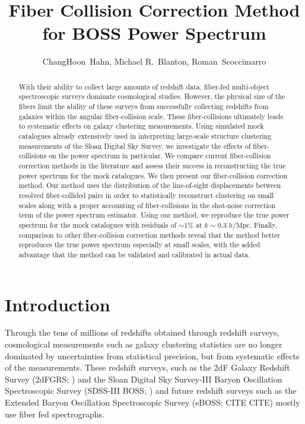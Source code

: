 \documentclass{emulateapj}
\begin{document}
\title{Fiber Collision Correction Method for BOSS Power Spectrum} 

\author{ChangHoon~Hahn, 
Michael R.~Blanton, 
Roman~Scoccimarro} 

\begin{abstract}
With their ability to collect large amounts of redshift data, fiber-fed multi-object spectroscopic surveys dominate cosmological studies. However, the physical size of the fibers limit the ability of these surveys from successfully collecting redshifts from galaxies within the angular fiber-collision scale. These fiber-collisions ultimately leads to systematic effects on galaxy clustering measurements. Using simulated mock catalogues already extensively used in interpreting large-scale structure clustering measurements of the Sloan Digital Sky Survey, we investigate the effects of fiber-collisions on the power spectrum in particular. We compare current fiber-collision correction methods in the literature and assess their success in reconstructing the true power spectrum for the mock catalogues. We then present our fiber-collision correction method. Our method uses the distribution of the line-of-sight displacements between resolved fiber-collided pairs in order to statistically reconstruct clustering on small scales along with a proper accounting of fiber-collisions in the shot-noise correction term of the power spectrum estimator. Using our method, we reproduce the true power spectrum for the mock catalogues with residuals of $\sim 1\%$ at $k \sim 0.3 \; h/\mathrm{Mpc}$. Finally, comparison to other fiber-collision correction methods reveal that the method better reproduces the true power spectrum especially at small scales, with the added advantage that the method can be validated and calibrated in actual data. 
\end{abstract}

\section{Introduction} 
Through the tens of millions of redshifts obtained through redshift surveys, cosmological measurements such as galaxy clustering statistics are no longer dominated by uncertainties from statistical precision, but from systematic effects of the measurements. These redshift surveys, such as the 2dF Galaxy Redshift Survey (2dFGRS; \citealt{Colless:1999aa}) and the Sloan Digital Sky Survey-III Baryon Oscillation Spectroscopic Survey (SDSS-III BOSS; \citealt{Anderson:2012aa, Dawson:2013aa}) and future redshift surveys such as the Extended Baryon Oscillation Spectroscopic Survey (eBOSS; CITE CITE) mostly use fiber fed spectrographs. 
\end{document}
